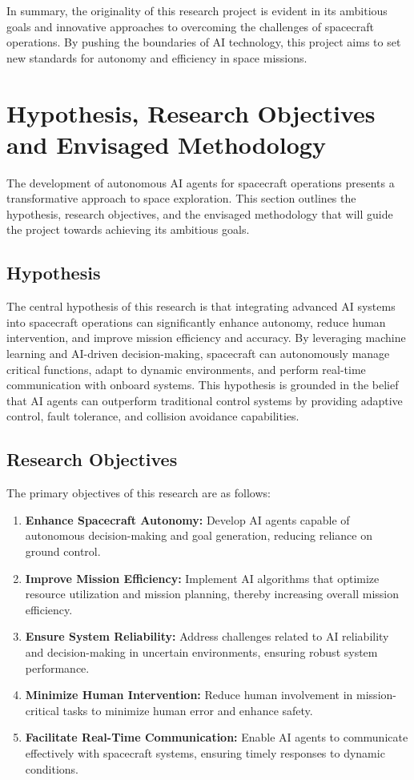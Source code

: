 \documentclass[a4paper, 11pt]{article}
\begin{document}
In summary, the originality of this research project is evident in its ambitious goals and innovative approaches to overcoming the challenges of spacecraft operations. By pushing the boundaries of AI technology, this project aims to set new standards for autonomy and efficiency in space missions.
\section{Hypothesis, Research Objectives and Envisaged Methodology}

The development of autonomous AI agents for spacecraft operations presents a transformative approach to space exploration. This section outlines the hypothesis, research objectives, and the envisaged methodology that will guide the project towards achieving its ambitious goals.

\subsection{Hypothesis}

The central hypothesis of this research is that integrating advanced AI systems into spacecraft operations can significantly enhance autonomy, reduce human intervention, and improve mission efficiency and accuracy. By leveraging machine learning and AI-driven decision-making, spacecraft can autonomously manage critical functions, adapt to dynamic environments, and perform real-time communication with onboard systems. This hypothesis is grounded in the belief that AI agents can outperform traditional control systems by providing adaptive control, fault tolerance, and collision avoidance capabilities.

\subsection{Research Objectives}

The primary objectives of this research are as follows:

\begin{enumerate}
    \item \textbf{Enhance Spacecraft Autonomy:} Develop AI agents capable of autonomous decision-making and goal generation, reducing reliance on ground control.
    \item \textbf{Improve Mission Efficiency:} Implement AI algorithms that optimize resource utilization and mission planning, thereby increasing overall mission efficiency.
    \item \textbf{Ensure System Reliability:} Address challenges related to AI reliability and decision-making in uncertain environments, ensuring robust system performance.
    \item \textbf{Minimize Human Intervention:} Reduce human involvement in mission-critical tasks to minimize human error and enhance safety.
    \item \textbf{Facilitate Real-Time Communication:} Enable AI agents to communicate effectively with spacecraft systems, ensuring timely responses to dynamic conditions.
\end{enumerate}
\end{document}
